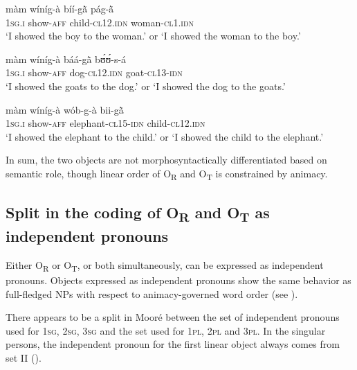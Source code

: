 \documentclass[output=paper]{langsci/langscibook}
\begin{document}
\ea
\label{ex:16.pacchiarotti}
\gll màm    wíníg-à    bíí-g\`{ã}      pág-\`{ã} \\
\textsc{1sg.i}    show-\textsc{aff}    child-\textsc{cl12.idn}  woman-\textsc{cl1.idn}\\
\glt`I showed the boy to the woman.' or `I showed the woman to the boy.'
\z

\ea
\label{ex:17.pacchiarotti}
\gll màm    wíníg-à    báá-g\`{ã}    bʊ́ʊ́-s-á \\
\textsc{1sg.i}    show-\textsc{aff}    dog-\textsc{cl12.idn}  goat-\textsc{cl13-idn}\\
\glt`I showed the goats to the dog.' or `I showed the dog to the goats.'  
\z

\ea
\label{ex:18.pacchiarotti}
\gll màm    wíníg-à    wób-g-à    bii-g\`{ã} \\
\textsc{1sg.i}    show-\textsc{aff}    elephant-\textsc{cl15-idn}  child-\textsc{cl12.idn}\\
\glt `I showed the elephant to the child.' or `I showed the child to the elephant.'
\z

In sum, the two objects are not morphosyntactically differentiated based on semantic role, though linear order of O\textsubscript{R} and O\textsubscript{T} is constrained by animacy.

\subsection{Split in the coding of O\textsubscript{R} and O\textsubscript{T} as independent pronouns}\label{§4.3:split.pacchiarotti}

Either O\textsubscript{R} or O\textsubscript{T}, or both simultaneously, can be expressed as independent pronouns. Objects expressed as independent pronouns show the same behavior as full-fledged NPs with respect to animacy-governed word order (see ). 

There appears to be a split in Mooré between the set of independent pronouns used for 1\textsc{sg}, 2\textsc{sg}, 3\textsc{sg} and the set used for 1\textsc{pl}, 2\textsc{pl} and 3\textsc{pl}. In the singular persons, the independent pronoun for the first linear object always comes from set II (). 

    
\end{document}
